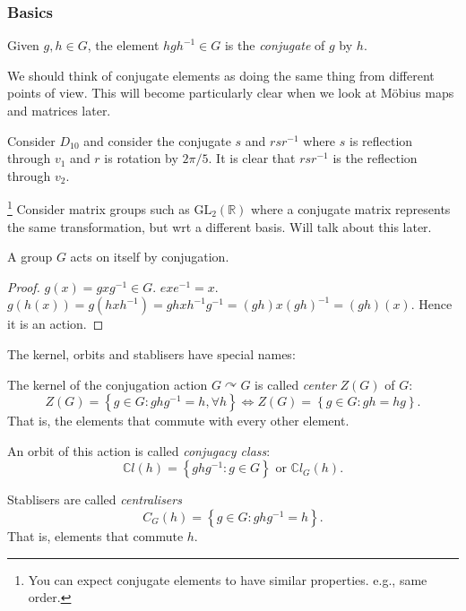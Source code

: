 \documentclass[a4paper]{article}
\begin{document}
      \subsubsection{Basics}
      \begin{definition}
          Given $g,h\in G$, the element $hgh^{-1}\in G$ is the \textit{conjugate} of $g$ by $h$.
      \end{definition}
      We should think of conjugate elements as doing the same thing from different points of view. This will become particularly clear when we look at M\"{o}bius maps and matrices later.
      \begin{example}
          Consider $D_{10}$ and consider the conjugate $s$ and $rsr^{-1}$ where $s$ is reflection through $v_1$ and $r$ is rotation by $2\pi/5 $. It is clear that $rsr^{-1}$ is the reflection through $v_2$. 
      \end{example}
      \begin{example}\footnote{You can expect conjugate elements to have similar properties. e.g., same order.}
          Consider matrix groups such as $ \mathrm{GL}_2(\mathbb{R}) $ where a conjugate matrix represents the same transformation, but wrt a different basis. Will talk about this later.
      \end{example}
      \begin{proposition}\label{prop:5.18}
          A group $G$ acts on itself by conjugation.
      \end{proposition}
      \begin{proof}
          $g(x)=gxg^{-1}\in G$. $exe^{-1}=x$. $ g(h(x))=g(hxh^{-1})=ghxh^{-1}g^{-1}=(gh)x(gh)^{-1}=(gh)(x) $. Hence it is an action. 
      \end{proof}
      The kernel, orbits and stablisers have special names:
      \begin{definition}
          The kernel of the conjugation action $ G \curvearrowright G $ is called \textit{center} $ Z(G) $ of $G$:
          \[
              Z(G)=\left\{ g\in G: ghg^{-1}=h, \forall h \right\} \Longleftrightarrow Z(G)=\left\{ g\in G: gh=hg \right\}
          .\] 
          That is, the elements that commute with every other element.

          An orbit of this action is called \textit{conjugacy class}:
          \[
              \mathbb{C}l(h)=\left\{ ghg^{-1}:g\in G \right\} \text{ or } \mathbb{C}l_G(h)
          .\]

          Stablisers are called \textit{centralisers}
          \[
              C_G(h)=\left\{ g\in G:ghg^{-1}=h \right\}
          .\]
          That is, elements that commute $h$.
      \end{definition}
\end{document}
